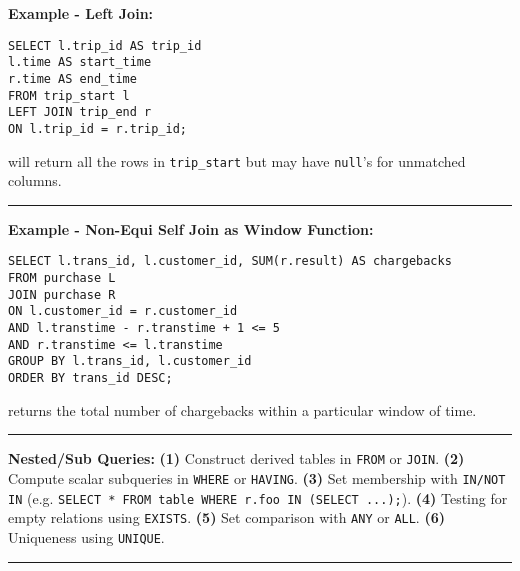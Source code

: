 \documentclass{report}
\renewcommand{\bf}[1]{\textbf{{#1}}}
\renewcommand{\tt}[1]{\texttt{{#1}}}
\begin{document}
\bf{Example - Left Join:}
\vspace{-1em}
\begin{verbatim}
SELECT l.trip_id AS trip_id
l.time AS start_time
r.time AS end_time
FROM trip_start l
LEFT JOIN trip_end r
ON l.trip_id = r.trip_id;
\end{verbatim}
\vspace{-1em}
will return all the rows in \tt{trip\_start} but may have \tt{null}'s for unmatched columns.
\hfil \newline
\vspace{-1em}
\hrule
\vspace{0.2em}

\bf{Example - Non-Equi Self Join as Window Function:}
\vspace{-1em}
\begin{verbatim}
SELECT l.trans_id, l.customer_id, SUM(r.result) AS chargebacks
FROM purchase L
JOIN purchase R
ON l.customer_id = r.customer_id 
AND l.transtime - r.transtime + 1 <= 5
AND r.transtime <= l.transtime
GROUP BY l.trans_id, l.customer_id
ORDER BY trans_id DESC;
\end{verbatim}
\vspace{-1em}
returns the total number of chargebacks within a particular window of time.
\hfil \newline
\vspace{-1em}
\hrule
\vspace{0.2em}

\bf{Nested/Sub Queries:}
\hfil \newline
\bf{(1)} Construct derived tables in \tt{FROM} or \tt{JOIN}.
\hfil \newline
\bf{(2)} Compute scalar subqueries in \tt{WHERE} or \tt{HAVING}.
\hfil \newline
\bf{(3)} Set membership with \tt{IN/NOT IN} (e.g. \tt{SELECT * FROM table WHERE r.foo IN (SELECT
...);}).
\hfil \newline
\bf{(4)} Testing for empty relations using \tt{EXISTS}.
\hfil \newline
\bf{(5)} Set comparison with \tt{ANY} or \tt{ALL}.
\hfil \newline
\bf{(6)} Uniqueness using \tt{UNIQUE}.
\hfil \newline
\vspace{-1em}
\hrule
\vspace{0.2em}
\end{document}
